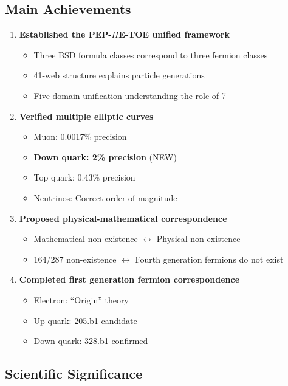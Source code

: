 ﻿\documentclass[11pt,a4paper]{article}
\begin{document}
\subsection{Main Achievements}

\begin{enumerate}
    \item \textbf{Established the PEP-$\Pi$E-TOE unified framework}
    \begin{itemize}
        \item Three BSD formula classes correspond to three fermion classes
        \item 41-web structure explains particle generations
        \item Five-domain unification understanding the role of 7
    \end{itemize}
    
    \item \textbf{Verified multiple elliptic curves}
    \begin{itemize}
        \item Muon: 0.0017\% precision
        \item \textbf{Down quark: 2\% precision} (NEW)
        \item Top quark: 0.43\% precision
        \item Neutrinos: Correct order of magnitude
    \end{itemize}
    
    \item \textbf{Proposed physical-mathematical correspondence}
    \begin{itemize}
        \item Mathematical non-existence $\leftrightarrow$ Physical non-existence
        \item 164/287 non-existence $\leftrightarrow$ Fourth generation fermions do not exist
    \end{itemize}
    
    \item \textbf{Completed first generation fermion correspondence}
    \begin{itemize}
        \item Electron: ``Origin'' theory
        \item Up quark: 205.b1 candidate
        \item Down quark: 328.b1 confirmed
    \end{itemize}
\end{enumerate}

\subsection{Scientific Significance}
\end{document}
